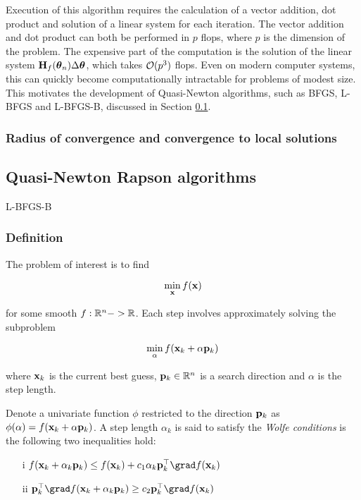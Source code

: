 \documentclass{article}[12pt]
\begin{document}
Execution of this algorithm requires the calculation of a vector addition, dot product and solution of a
linear system for each iteration. The vector addition and dot product can both be performed in $p$ flops,
where $p$ is the dimension of the problem. The expensive part of the computation is the solution of the linear
system ${\bf H}_f({\boldsymbol \theta}_n) \Delta {\boldsymbol\theta}$, which takes ${\mathcal O}(p^3)$ flops. Even on modern computer systems, this
can quickly become computationally intractable for problems of modest size. This motivates the development
of Quasi-Newton algorithms, such as BFGS, L-BFGS and L-BFGS-B, discussed in Section \ref{sec:quasi_newton}.

\subsubsection{Radius of convergence and convergence to local solutions}

\subsection{Quasi-Newton Rapson algorithms}
\label{sec:quasi_newton}
L-BFGS-B

\subsubsection{Definition}

The problem of interest is to find

$$
\min_{\bf x} f({\bf x})
$$

for some smooth $f: {\mathbb{R}}^n -> {\mathbb{R}}$. Each step involves approximately solving the subproblem

$$
\min_\alpha f({\bf x}_k + \alpha {\bf p}_k)
$$

where ${\bf x}_k$ is the current best guess, ${\bf p}_k \in {\mathbb{R}}^n$ is a search direction and $\alpha$ is the
step length.

Denote a univariate function $\phi$ restricted to the direction ${\bf p}_k$ as
$\phi(\alpha) = f({\bf x}_k + \alpha {\bf p}_k)$. A step length $\alpha_k$ is said to satisfy the \emph{Wolfe conditions}
is the following two inequalities hold:

\begin{enumerate}
\item[i] $f(\vx_k + \alpha_k \vp_k) \leq f(\vx_k) + c_1 \alpha_k \vp_k^\top \grad f(\vx_k)$ 
\item[ii] $\vp_k^\top \grad f(\vx_k + \alpha_k \vp_k) \geq c_2 \vp_k^\top \grad f(\vx_k)$ 
\end{enumerate}
\end{document}
